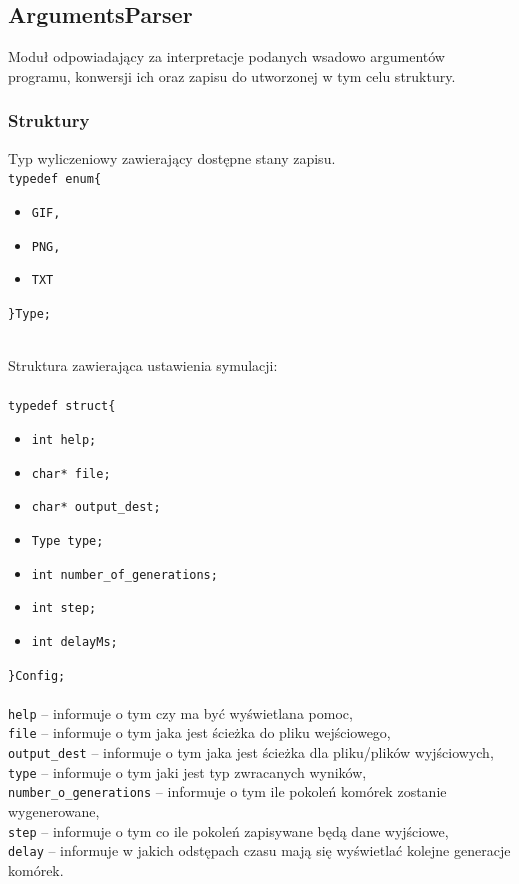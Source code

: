 \documentclass{mwart}
\begin{document}
\subsection{ArgumentsParser}
Moduł odpowiadający za interpretacje podanych wsadowo argumentów programu, konwersji ich oraz zapisu do utworzonej w tym celu struktury.

\subsubsection{Struktury}
\begin{samepage}
Typ wyliczeniowy zawierający dostępne stany zapisu. \\

\noindent\texttt{typedef enum\{}
\begin{itemize}[label={}, noitemsep, topsep=0pt]
	\item \texttt{GIF,}
	\item \texttt{PNG,}
	\item \texttt{TXT}
\end{itemize}
\texttt{\}Type;}\\\\
\end{samepage}


\noindent Struktura zawierająca ustawienia symulacji: \\\\

\noindent\texttt{typedef struct\{}
\begin{itemize}[label={}, noitemsep, topsep=0pt]
	\item \texttt{int help;}
	\item \texttt{char* file;}
	\item \texttt{char* output\_dest;}
	\item \texttt{Type type;}
	\item \texttt{int number\_of\_generations;}
	\item \texttt{int step;}
	\item \texttt{int delayMs;}
\end{itemize}
\texttt{\}Config;}
\\\\
\texttt{help} -- informuje o tym czy ma być wyświetlana pomoc,\\
\texttt{file} -- informuje o tym jaka jest ścieżka do pliku wejściowego,\\
\texttt{output\_dest} --  informuje o tym jaka jest ścieżka dla pliku/plików wyjściowych,\\
\texttt{type} -- informuje o tym jaki jest typ zwracanych wyników,\\
\texttt{number\_o\_generations} -- informuje o tym ile pokoleń komórek zostanie wygenerowane,\\
\texttt{step} -- informuje o tym co ile pokoleń zapisywane będą dane wyjściowe,\\
\texttt{delay} -- informuje w jakich odstępach czasu mają się wyświetlać kolejne generacje komórek.\\
\end{document}
